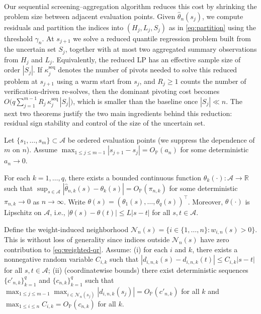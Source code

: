 \documentclass[lineno]{biometrika}
\begin{document}
Our sequential screening--aggregation algorithm reduces this cost by shrinking the problem size between adjacent
evaluation points. Given $\hat\theta_n(s_j)$, we compute residuals and partition the indices into $(H_j,L_j,S_j)$ as
in \eqref{eq:partition} using the threshold $\gamma_n$. At $s_{j+1}$ we solve a reduced quantile regression problem
built from the uncertain set $S_j$, together with at most two aggregated summary observations from $H_j$ and $L_j$.
Equivalently, the reduced LP has an effective sample size of order $|S_j|$. If $\kappa^{\mathrm{seq}}_j$ denotes the
number of pivots needed to solve this reduced problem at $s_{j+1}$ using a warm start from $s_j$, and $R_j\ge 1$
counts the number of verification-driven re-solves, then the dominant pivoting cost becomes
$O\!\big(q\sum_{j=1}^{m-1} R_j\,\kappa^{\mathrm{seq}}_j\,|S_j|\big)$, which is smaller than the baseline once
$|S_j|\ll n$. The next two theorems justify the two main ingredients behind this reduction: residual sign stability and
control of the size of the uncertain set.


\begin{condition}\label{cond:spacing}
Let $\{s_1,\ldots,s_m\}\subset\mathcal A$ be ordered evaluation points (we suppress the dependence of $m$ on $n$).
Assume $\max_{1\le j\le m-1}|s_{j+1}-s_j|=O_{\mathbb P}(a_n)$ for some deterministic $a_n\to 0$.
\end{condition}

\begin{condition}\label{cond:rate}
For each $k=1,\ldots,q$, there exists a bounded continuous function $\theta_k(\cdot):\mathcal A\to\mathbb R$ such that
$\sup_{s\in\mathcal A}|\hat\theta_{n,k}(s)-\theta_k(s)|=O_{\mathbb P}(\pi_{n,k})$ for some deterministic $\pi_{n,k}\to 0$ as $n\to\infty$.
Write $\theta(s)=(\theta_1(s),\ldots,\theta_q(s))^\top$.
Moreover, $\theta(\cdot)$ is Lipschitz on $\mathcal A$, i.e., $|\theta(s)-\theta(t)|\le L|s-t|$ for all $s,t\in\mathcal A$.
\end{condition}

\begin{condition}\label{cond:reg}
Define the weight-induced neighborhood $\mathcal N_n(s)=\{i\in\{1,\ldots,n\}:w_{i,n}(s)>0\}$.
This is without loss of generality since indices outside $\mathcal N_n(s)$ have zero contribution to \eqref{eq:weighted-qr}.
Assume:
(i) for each $i$ and $k$, there exists a nonnegative random variable $C_{i,k}$ such that
$|d_{i,n,k}(s)-d_{i,n,k}(t)|\le C_{i,k}|s-t|$ for all $s,t\in\mathcal A$;
(ii) (coordinatewise bounds) there exist deterministic sequences $\{c'_{n,k}\}_{k=1}^q$ and $\{c_{n,k}\}_{k=1}^q$ such that
$\max_{1\le j\le m-1}\max_{i\in\mathcal N_n(s_j)} |d_{i,n,k}(s_j)|=O_{\mathbb P}(c'_{n,k})$ for all $k$ and
$\max_{1\le i\le n} C_{i,k}=O_{\mathbb P}(c_{n,k})$ for all $k$.
\end{condition}
\end{document}
